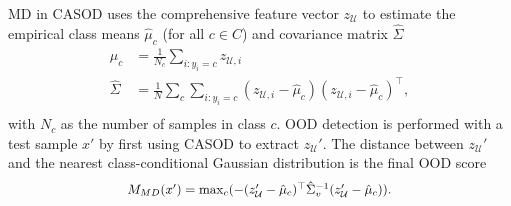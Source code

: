 MD in CASOD uses the comprehensive feature vector $z_{\mathcal{U}}$ to estimate the empirical class means $\hat{\mu}_{c}$ (for all $c \in C$) and covariance matrix $\hat{\Sigma}$
\begin{equation}
\begin{aligned}
\hat{\mu}_{c} & = \frac{1}{N_{c}} \sum_{i:y_{i}=c} z_{\mathcal{U},i} \\
\hat{\Sigma} & = \frac{1}{N} \sum_{c} \sum_{i:y_{i}=c} (z_{\mathcal{U},i} - \hat{\mu}_{c}) (z_{\mathcal{U},i} - \hat{\mu}_{c})^\top, \\
\end{aligned}
\end{equation}
with $N_c$ as the number of samples in class $c$. OOD detection is performed with a test sample $x'$ by first using CASOD to extract $z_{\mathcal{U}}'$. The distance between $z_{\mathcal{U}}'$ and the nearest class-conditional Gaussian distribution is the final OOD score
\begin{equation}
\scalebox{0.93}{$
M_{MD}(x') = \max_{c} (-(z_{\mathcal{U}}' - \hat{\mu}_{c})^\top \hat{\Sigma}_{v}^{-1} (z_{\mathcal{U}}' - \hat{\mu}_{c})). \\
$}
\end{equation}
